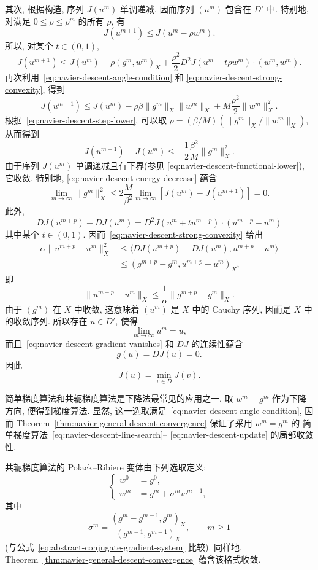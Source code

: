\begin{Proof}
其次, 根据构造, 序列 $J(u^m)$ 单调递减, 因而序列 $(u^m)$ 包含在 $D'$ 中.
特别地, 对满足 $0\leq\rho\leq\rho^m$ 的所有 $\rho$, 有
\[
J(u^{m+1})\leq J(u^m-\rho w^m).
\]
所以, 对某个 $t\in(0,1)$,
\[
J(u^{m+1})\leq J(u^m)-\rho(g^m,w^m)_X
+\frac{\rho^2}{2}D^2J(u^m-t\rho w^m)\mathbin{\cdot}(w^m,w^m).
\]
再次利用 \,\eqref{eq:navier-descent-angle-condition} 和
\eqref{eq:navier-descent-strong-convexity}, 得到
\[
J(u^{m+1})\leq J(u^m)-\rho\beta\|g^m\|_X\|w^m\|_X
+M\frac{\rho^2}{2}\|w^m\|_X^2.
\]
根据 \,\eqref{eq:navier-descent-step-lower}, 可以取
$\rho=(\beta/M)(\|g^m\|_X/\|w^m\|_X)$, 从而得到
\begin{equation}
\label{eq:navier-descent-energy-decrease}
J(u^{m+1})-J(u^m)\leq-\frac12\frac{\beta^2}{M}\|g^m\|_X^2.
\end{equation}
由于序列 $J(u^m)$ 单调递减且有下界(参见
\eqref{eq:navier-descent-functional-lower}), 它收敛. 特别地,
\eqref{eq:navier-descent-energy-decrease} 蕴含
\begin{equation}
\label{eq:navier-descent-gradient-vanishes}
\lim_{m\to\infty}\|g^m\|_X^2
\leq2\frac{M}{\beta^2}\lim_{m\to\infty}
[J(u^m)-J(u^{m+1})]=0.
\end{equation}
此外,
\[
DJ(u^{m+p})-DJ(u^m)
=D^2J(u^m+t u^{m+p})\mathbin{\cdot}(u^{m+p}-u^m)
\]
其中某个 $t\in(0,1)$. 因而 \,\eqref{eq:navier-descent-strong-convexity} 给出
\[
\begin{aligned}
\alpha\|u^{m+p}-u^m\|_X^2
&\leq\langle DJ(u^{m+p})-DJ(u^m),u^{m+p}-u^m\rangle\\
&\leq(g^{m+p}-g^m,u^{m+p}-u^m)_X,
\end{aligned}
\]
即
\[
\|u^{m+p}-u^m\|_X\leq\frac1\alpha\|g^{m+p}-g^m\|_X.
\]
由于 $(g^m)$ 在 $X$ 中收敛, 这意味着 $(u^m)$ 是 $X$ 中的 Cauchy 序列,
因而是 $X$ 中的收敛序列. 所以存在 $u\in D'$, 使得
\[
\lim_{m\to\infty}u^m=u,
\]
而且 \,\eqref{eq:navier-descent-gradient-vanishes} 和 $DJ$ 的连续性蕴含
\[
g(u)=DJ(u)=0.
\]
因此
\[
J(u)=\min_{v\in D}J(v).
\]
\end{Proof}

简单梯度算法和共轭梯度算法是下降法最常见的应用之一. 取 $w^m=g^m$ 作为下降方向,
便得到梯度算法. 显然, 这一选取满足 \,\eqref{eq:navier-descent-angle-condition},
因而 Theorem~\ref{thm:navier-general-descent-convergence} 保证了采用 $w^m=g^m$ 的
简单梯度算法 \,\eqref{eq:navier-descent-line-search}--
\eqref{eq:navier-descent-update} 的局部收敛性.

共轭梯度算法的 Polack--Ribiere 变体由下列选取定义:
\begin{equation}
\label{eq:navier-conjugate-gradient-direction}
\left\{
\begin{aligned}
w^0&=g^0,\\
w^m&=g^m+\sigma^mw^{m-1},
\end{aligned}
\right.
\end{equation}
其中
\begin{equation}
\label{eq:navier-conjugate-gradient-coefficient}
\sigma^m=\frac{(g^m-g^{m-1},g^m)_X}{(g^{m-1},g^{m-1})_X},
\qquad m\geq1
\end{equation}
(与公式 \,\eqref{eq:abstract-conjugate-gradient-system} 比较). 同样地,
Theorem~\ref{thm:navier-general-descent-convergence}
蕴含该格式收敛.


